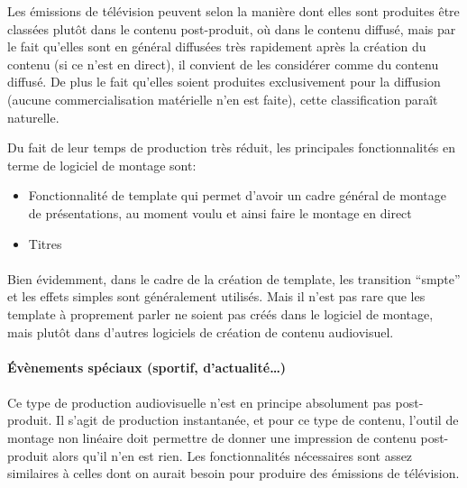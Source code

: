 Les émissions de télévision peuvent selon la manière dont elles
sont produites être classées plutôt dans le contenu post-produit,
où dans le contenu diffusé, mais par le fait qu'elles sont en
général diffusées très rapidement après la création du contenu
(si ce n'est en direct), il convient de les considérer comme du contenu
diffusé. De plus le fait qu'elles soient produites exclusivement pour
la diffusion (aucune commercialisation matérielle n'en est faite),
cette classification paraît naturelle.

Du fait de leur temps de production très réduit, les principales
fonctionnalités en terme de logiciel de montage sont: \begin{itemize}
\setlength{\itemsep}{2mm}
  \item{Fonctionnalité de template qui permet d'avoir un cadre général
  de montage de
    présentations, au moment voulu et ainsi faire le montage en direct}
  \item{Titres}
\end{itemize}

\paragraph{}

Bien évidemment, dans le cadre de la création de template,
les transition ``smpte'' et les effets simples sont
généralement utilisés. Mais il n'est pas rare que les template à
proprement parler ne soient pas créés dans le logiciel de montage,
mais plutôt dans d'autres logiciels de création de contenu audiovisuel.

\paragraph {Évènements spéciaux (sportif, d'actualité\ldots)}

\paragraph{}

Ce type de production audiovisuelle n'est en principe absolument pas
post-produit. Il s'agit de production instantanée, et pour ce type
de contenu, l'outil de montage non linéaire doit permettre de donner
une impression de contenu post-produit alors qu'il n'en est rien. Les
fonctionnalités nécessaires sont assez similaires à celles dont on
aurait besoin pour produire des émissions de télévision.

\subparagraph{}

